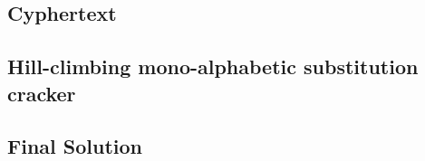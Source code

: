 \documentclass[pdftex, 12pt, a4paper]{article}
\begin{document}
\subsection{Cyphertext}\label{q3-cyphertext}

\subsection{Hill-climbing mono-alphabetic substitution cracker}\label{break-simplesub}

\pagebreak

\subsection{Final Solution}\label{q3-solution}
\pagebreak
\end{document}
